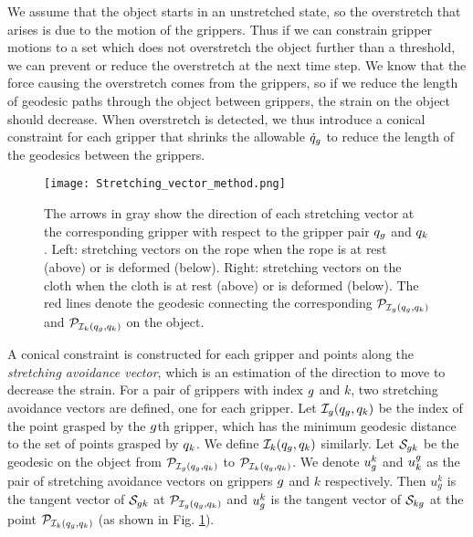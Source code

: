 We assume that the object starts in an unstretched state, so the overstretch that arises is due to the motion of the grippers. Thus if we can constrain gripper motions to a set which does not overstretch the object further than a threshold, we can prevent or reduce the overstretch at the next time step. We know that the force causing the overstretch comes from the grippers, so if we reduce the length of geodesic paths through the object between grippers, the strain on the object should decrease. When overstretch is detected, we thus introduce a conical constraint for each gripper that shrinks the allowable $\dot{q}_g$ to reduce the length of the geodesics between the grippers. 

\begin{figure}[ht]
    \centering
    \texttt{[image: Stretching\_vector\_method.png]}
    \caption{The arrows in gray show the direction of each stretching vector at the corresponding gripper with respect to the gripper pair $q_g$ and $q_k$. Left: stretching vectors on the rope when the rope is at rest (above) or is deformed (below). Right: stretching vectors on the cloth when the cloth is at rest (above) or is deformed (below). The red lines denote the geodesic connecting the corresponding $\mathcal{P}_{\mathcal{I}_g(q_g, q_k)}$ and $\mathcal{P}_{\mathcal{I}_k(q_g, q_k)}$ on the object.}
    \label{Fig:stretching_avoidance_vector_method}
\end{figure}

A conical constraint is constructed for each gripper and points along the \textit{stretching avoidance vector}, which is an estimation of the direction to move to decrease the strain. For a pair of grippers with index $g$ and $k$, two stretching avoidance vectors are defined, one for each gripper. Let $\mathcal{I}_g(q_g, q_k)$ be the index of the point grasped by the $g$th gripper, which has the minimum geodesic distance to the set of points grasped by $q_k$. We define $\mathcal{I}_k(q_g, q_k)$ similarly.  Let $\mathcal{S}_{g k}$ be the geodesic on the object from $\mathcal{P}_{\mathcal{I}_g(q_g, q_k)}$ to $\mathcal{P}_{\mathcal{I}_k(q_g, q_k)}$. We denote $u_g^k$ and $u_k^g$ as the pair of stretching avoidance vectors on grippers $g$ and $k$ respectively.  Then $u^k_g$ is the tangent vector of $\mathcal{S}_{g k}$ at $\mathcal{P}_{\mathcal{I}_g(q_g, q_k)}$ and $u_g^k$ is the tangent vector of $\mathcal{S}_{k g}$ at the point $\mathcal{P}_{\mathcal{I}_k(q_g, q_k)}$ (as shown in Fig. \ref{Fig:stretching_avoidance_vector_method}). 


